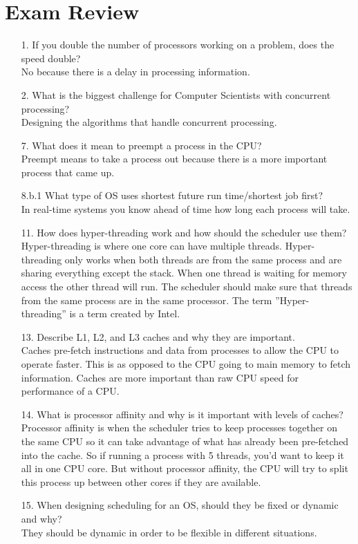 \documentclass{report}
\begin{document}
\section*{Exam Review}
\begin{enumerate}
	\item[1.]If you double the number of processors working on a problem, does the speed double?\\
	No because there is a delay in processing information.
	
	\item[2.] What is the biggest challenge for Computer Scientists with concurrent processing?\\
Designing the algorithms that handle concurrent processing.

	\item[7.]What does it mean to preempt a process in the CPU?\\
	Preempt means to take a process out because there is a more important process that came up.
	
	\item[8.b.1]What type of OS uses shortest future run time/shortest job first?\\
	In real-time systems you know ahead of time how long each process will take.

	\item[11.]How does hyper-threading work and how should the scheduler use them?\\
	Hyper-threading is where one core can have multiple threads. Hyper-threading only works when both threads are from the same process and are sharing everything except the stack. When one thread is waiting for memory access the other thread will run. The scheduler should make sure that threads from the same process are in the same processor. The term ''Hyper-threading'' is a term created by Intel.
	
	\item[13.]Describe L1, L2, and L3 caches and why they are important.\\
	Caches pre-fetch instructions and data from processes to allow the CPU to operate faster. This is as opposed to the CPU going to main memory to fetch information. Caches are more important than raw CPU speed for performance of a CPU.
	
	\item[14.]What is processor affinity and why is it important with levels of caches?\\
	Processor affinity is when the scheduler tries to keep processes together on the same CPU so it can take advantage of what has already been pre-fetched into the cache. So if running a process with 5 threads, you'd want to keep it all in one CPU core. But without processor affinity, the CPU will try to split this process up between other cores if they are available.
	
	\item[15.]When designing scheduling for an OS, should they be fixed or dynamic and why?\\
	They should be dynamic in order to be flexible in different situations.
\end{enumerate}
\end{document}
